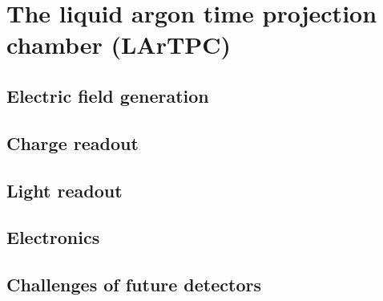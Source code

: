 \chapter{The liquid argon time projection chamber (LArTPC)\label{chap:lartpc}}


\section{Electric field generation\label{sec:lartpc_efield}}


\section{Charge readout\label{sec:lartpc_readout}}


\section{Light readout\label{sec:lartpc_light}}


\section{Electronics\label{sec:lartpc_electronics}}


\section{Challenges of future detectors\label{sec:lartpc_challenges}}